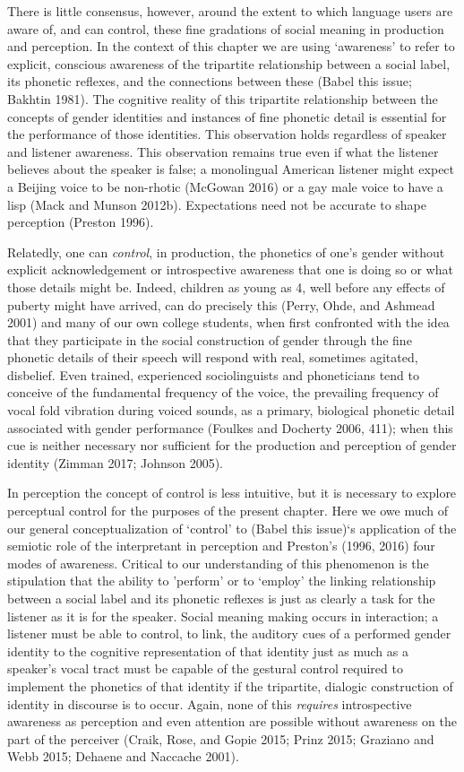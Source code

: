 \documentclass[
  letterpaper,
  DIV=11,
  numbers=noendperiod]{scrartcl}
\begin{document}
There is little consensus, however, around the extent to which language
users are aware of, and can control, these fine gradations of social
meaning in production and perception. In the context of this chapter we
are using `awareness' to refer to explicit, conscious awareness of the
tripartite relationship between a social label, its phonetic reflexes,
and the connections between these (Babel this issue; Bakhtin 1981). The
cognitive reality of this tripartite relationship between the concepts
of gender identities and instances of fine phonetic detail is essential
for the performance of those identities. This observation holds
regardless of speaker and listener awareness. This observation remains
true even if what the listener believes about the speaker is false; a
monolingual American listener might expect a Beijing voice to be
non-rhotic (McGowan 2016) or a gay male voice to have a lisp (Mack and
Munson 2012b). Expectations need not be accurate to shape perception
(Preston 1996).

Relatedly, one can \emph{control}, in production, the phonetics of one's
gender without explicit acknowledgement or introspective awareness that
one is doing so or what those details might be. Indeed, children as
young as 4, well before any effects of puberty might have arrived, can
do precisely this (Perry, Ohde, and Ashmead 2001) and many of our own
college students, when first confronted with the idea that they
participate in the social construction of gender through the fine
phonetic details of their speech will respond with real, sometimes
agitated, disbelief. Even trained, experienced sociolinguists and
phoneticians tend to conceive of the fundamental frequency of the voice,
the prevailing frequency of vocal fold vibration during voiced sounds,
as a primary, biological phonetic detail associated with gender
performance (Foulkes and Docherty 2006, 411); when this cue is neither
necessary nor sufficient for the production and perception of gender
identity (Zimman 2017; Johnson 2005).

In perception the concept of control is less intuitive, but it is
necessary to explore perceptual control for the purposes of the present
chapter. Here we owe much of our general conceptualization of `control'
to (Babel this issue)`s application of the semiotic role of the
interpretant in perception and Preston's (1996, 2016) four modes of
awareness. Critical to our understanding of this phenomenon is the
stipulation that the ability to 'perform' or to `employ' the linking
relationship between a social label and its phonetic reflexes is just as
clearly a task for the listener as it is for the speaker. Social meaning
making occurs in interaction; a listener must be able to control, to
link, the auditory cues of a performed gender identity to the cognitive
representation of that identity just as much as a speaker's vocal tract
must be capable of the gestural control required to implement the
phonetics of that identity if the tripartite, dialogic construction of
identity in discourse is to occur. Again, none of this \emph{requires}
introspective awareness as perception and even attention are possible
without awareness on the part of the perceiver (Craik, Rose, and Gopie
2015; Prinz 2015; Graziano and Webb 2015; Dehaene and Naccache 2001).
\end{document}
